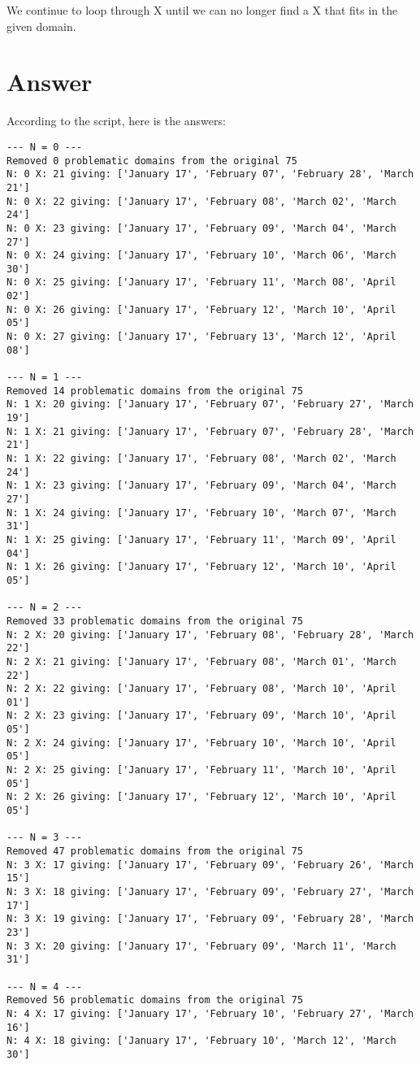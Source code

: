 \documentclass{article}
\begin{document}
    We continue to loop through X until we can no longer find a X that fits in the given domain.

  \section{Answer}
    According to the script, here is the answers:
    \begin{verbatim}
--- N = 0 ---
Removed 0 problematic domains from the original 75
N: 0 X: 21 giving: ['January 17', 'February 07', 'February 28', 'March 21']
N: 0 X: 22 giving: ['January 17', 'February 08', 'March 02', 'March 24']
N: 0 X: 23 giving: ['January 17', 'February 09', 'March 04', 'March 27']
N: 0 X: 24 giving: ['January 17', 'February 10', 'March 06', 'March 30']
N: 0 X: 25 giving: ['January 17', 'February 11', 'March 08', 'April 02']
N: 0 X: 26 giving: ['January 17', 'February 12', 'March 10', 'April 05']
N: 0 X: 27 giving: ['January 17', 'February 13', 'March 12', 'April 08']

--- N = 1 ---
Removed 14 problematic domains from the original 75
N: 1 X: 20 giving: ['January 17', 'February 07', 'February 27', 'March 19']
N: 1 X: 21 giving: ['January 17', 'February 07', 'February 28', 'March 21']
N: 1 X: 22 giving: ['January 17', 'February 08', 'March 02', 'March 24']
N: 1 X: 23 giving: ['January 17', 'February 09', 'March 04', 'March 27']
N: 1 X: 24 giving: ['January 17', 'February 10', 'March 07', 'March 31']
N: 1 X: 25 giving: ['January 17', 'February 11', 'March 09', 'April 04']
N: 1 X: 26 giving: ['January 17', 'February 12', 'March 10', 'April 05']

--- N = 2 ---
Removed 33 problematic domains from the original 75
N: 2 X: 20 giving: ['January 17', 'February 08', 'February 28', 'March 22']
N: 2 X: 21 giving: ['January 17', 'February 08', 'March 01', 'March 22']
N: 2 X: 22 giving: ['January 17', 'February 08', 'March 10', 'April 01']
N: 2 X: 23 giving: ['January 17', 'February 09', 'March 10', 'April 05']
N: 2 X: 24 giving: ['January 17', 'February 10', 'March 10', 'April 05']
N: 2 X: 25 giving: ['January 17', 'February 11', 'March 10', 'April 05']
N: 2 X: 26 giving: ['January 17', 'February 12', 'March 10', 'April 05']

--- N = 3 ---
Removed 47 problematic domains from the original 75
N: 3 X: 17 giving: ['January 17', 'February 09', 'February 26', 'March 15']
N: 3 X: 18 giving: ['January 17', 'February 09', 'February 27', 'March 17']
N: 3 X: 19 giving: ['January 17', 'February 09', 'February 28', 'March 23']
N: 3 X: 20 giving: ['January 17', 'February 09', 'March 11', 'March 31']

--- N = 4 ---
Removed 56 problematic domains from the original 75
N: 4 X: 17 giving: ['January 17', 'February 10', 'February 27', 'March 16']
N: 4 X: 18 giving: ['January 17', 'February 10', 'March 12', 'March 30']
  \end{verbatim}
\end{document}
